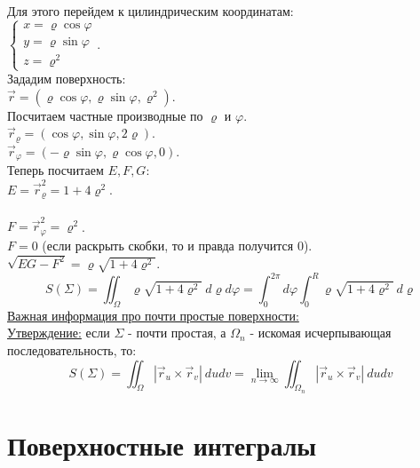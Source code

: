 \documentclass[12pt]{article}
\begin{document}
Для этого перейдем к цилиндрическим координатам:\\
$\begin{cases} x=\varrho \cos \varphi \\ y = \varrho \sin \varphi \\ z = \varrho^2 \end{cases}$.\\
Зададим поверхность:\\
$\overrightarrow{r} = (\varrho\cos\varphi, \varrho\sin\varphi, \varrho^2)$.\\
Посчитаем частные производные по $\varrho$ и $\varphi$.\\
$\overrightarrow{r}_\varrho = (\cos\varphi, \sin\varphi, 2\varrho)$.\\
$\overrightarrow{r}_\varphi = (-\varrho\sin\varphi, \varrho\cos\varphi, 0)$.\\
Теперь посчитаем $E, F, G$:\\
$E = \overrightarrow{r}_\varrho^2 = 1 + 4 \varrho^2$.\\\\
$F = \overrightarrow{r}_\varphi^2 = \varrho^2$.\\
$F = 0$ (если раскрыть скобки, то и правда получится 0).\\
$\sqrt{EG-F^2} = \varrho\sqrt{1+4\varrho^2}$.\\
$$S(\Sigma)=\iint_\Omega \varrho\sqrt{1+4\varrho^2} \ d\varrho d\varphi = \int_0^{2\pi} d\varphi \int_0^R \varrho\sqrt{1+4\varrho^2} \ d\varrho$$
\uline{Важная информация про почти простые поверхности:}\\
\uline{Утверждение:} если $\Sigma$ - почти простая, а $\Omega_n$ - искомая исчерпывающая последовательность, то:\\
$$S(\Sigma) = \iint_\Omega |\overrightarrow{r}_u \times \overrightarrow{r}_v| \ dudv = \lim_{n\to\infty} \iint_{\Omega_n} |\overrightarrow{r}_u \times \overrightarrow{r}_v| \ dudv$$
\section{Поверхностные интегралы}
\end{document}
